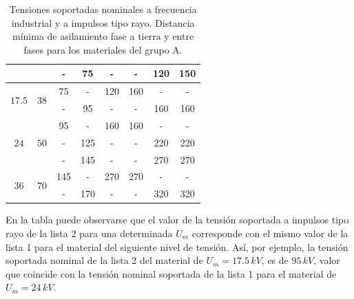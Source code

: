 \begin{table}[H]
{\begin{tabular}{|c|c|c|c|c|c|c|c|}
                                           &                       & - & 75 & -  &   - & 120 & 150 \\
                    \hline
                    \multirow{2}{*}{$17.5$}& \multirow{2}{*}{$38$} & 75 & - & 120 & 160 & - & - \\
                                           &                       & - & 95 & -  &   - & 160 & 160 \\
                    \hline
                    \multirow{3}{*}{$24$}  & \multirow{3}{*}{$50$} & 95 & - & 160 & 160 & - & - \\
                                           &                       & - & 125 & -  &   - & 220 & 220 \\
                                           &                       & - & 145 & -  &   - & 270 & 270 \\
                    \hline
                    \multirow{2}{*}{$36$}  & \multirow{2}{*}{$70$} & 145 & - & 270 & 270 & - & - \\
                                           &                       & - & 170 & -  &   - & 320 & 320 \\
                    \hline
                \end{tabular}
                }
                \caption{Tensiones soportadas nominales a frecuencia industrial y a impulsos tipo rayo. Distancia mínima de asilamiento fase a tierra y entre fases para los materiales del grupo A.}
                \label{tab:tensionesSoportadasA}
            \end{table}

            En la tabla puede observarse que el valor de la tensión soportada a impulsos tipo rayo de la lista 2 para una determinada $U_\textit{m}$ corresponde con el mismo valor de la lista 1 para el material del siguiente nivel de tensión. Así, por ejemplo, la tensión soportada nominal de la lista 2 del material de $U_\textit{m}=17.5\,\textit{kV}$, es de $95\,\textit{kV}$, valor que coincide con la tensión nominal soportada de la lista 1 para el material de $U_\textit{m}=24\,\textit{kV}$.
        
